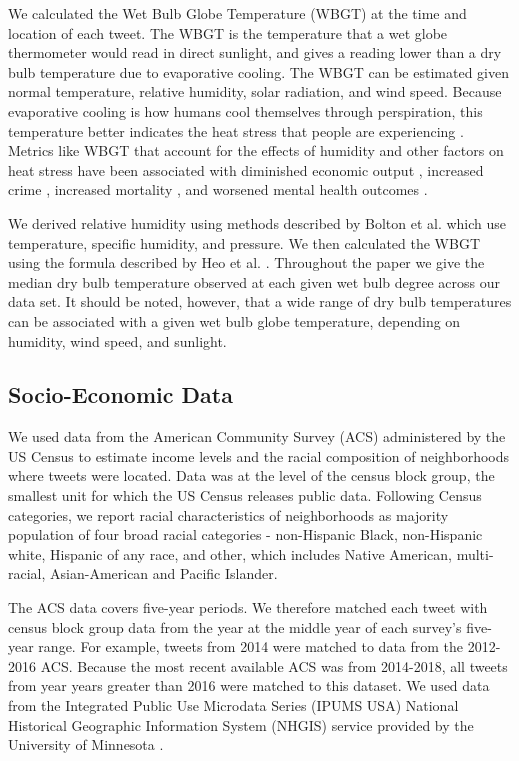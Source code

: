 \documentclass[9pt,twocolumn,twoside,lineno]{pnas-new}
\begin{document}
We calculated the Wet Bulb Globe Temperature (WBGT) at the time and location of each tweet. The WBGT is the temperature that a wet globe thermometer would read in direct sunlight, and gives a reading lower than a dry bulb temperature due to evaporative cooling. The WBGT can be estimated given normal temperature, relative humidity, solar radiation, and wind speed. Because evaporative cooling is how humans cool themselves through perspiration, this temperature better indicates the heat stress that people are experiencing \cite{budd2008wet}. Metrics like WBGT that account for the effects of humidity and other factors on heat stress have been associated with diminished economic output \cite{rao2020projections}, increased crime \cite{hu2017impact}, increased mortality \cite{chien2016spatiotemporal, armstrong2019role}, and worsened mental health outcomes \cite{vida2012relationship, ding2016importance}.

We derived relative humidity using methods described by Bolton et al. \cite{bolton_computation_1980} which use temperature, specific humidity, and pressure. We then calculated the WBGT using the formula described by Heo et al. \cite{heo2019comparison}.  Throughout the paper we give the median dry bulb temperature observed at each given wet bulb degree across our data set. It should be noted, however, that a wide range of dry bulb temperatures can be associated with a given wet bulb globe temperature, depending on humidity, wind speed, and sunlight.

\subsection*{Socio-Economic Data}
We used data from the American Community Survey (ACS) administered by the US Census to estimate income levels and the racial composition of neighborhoods where tweets were located. Data was at the level of the census block group, the smallest unit for which the US Census releases public data. Following Census categories, we report racial characteristics of neighborhoods as majority population of four broad racial categories - non-Hispanic Black, non-Hispanic white, Hispanic of any race, and other, which includes Native American, multi-racial, Asian-American and Pacific Islander. 

The ACS data covers five-year periods. We therefore matched each tweet with census block group data from the year at the middle year of each survey's five-year range. For example, tweets from 2014 were matched to data from the 2012-2016 ACS. Because the most recent available ACS was from 2014-2018, all tweets from year years greater than 2016 were matched to this dataset. We used data from the Integrated Public Use Microdata Series (IPUMS USA) National Historical Geographic Information System (NHGIS) service provided by the University of Minnesota \cite{ruggles2018ipums}.
\end{document}
